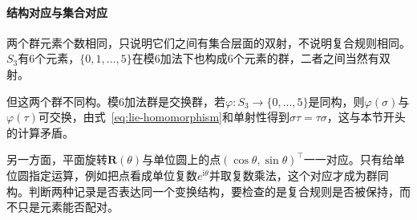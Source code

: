 \paragraph{结构对应与集合对应}
两个群元素个数相同，只说明它们之间有集合层面的双射，不说明复合规则相同。$S_3$有$6$个元素，$\{0,1,\ldots,5\}$在模$6$加法下也构成$6$个元素的群，二者之间当然有双射。

但这两个群不同构。模$6$加法群是交换群，若$\varphi:S_3\to\{0,\ldots,5\}$是同构，则$\varphi(\sigma)$与$\varphi(\tau)$可交换，由式~\eqref{eq:lie-homomorphism}和单射性得到$\sigma\tau=\tau\sigma$，这与本节开头的计算矛盾。

另一方面，平面旋转$\bm R(\theta)$与单位圆上的点$(\cos\theta,\sin\theta)^\top$一一对应。只有给单位圆指定运算，例如把点看成单位复数$e^{\mathrm i\theta}$并取复数乘法，这个对应才成为群同构。判断两种记录是否表达同一个变换结构，要检查的是复合规则是否被保持，而不只是元素能否配对。
